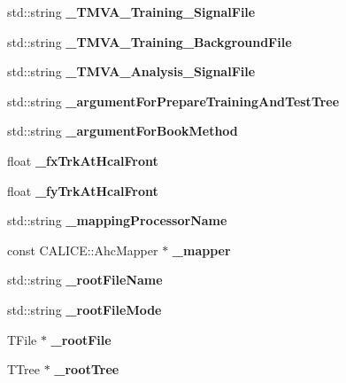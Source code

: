 \begin{DoxyCompactItemize}
\item 
std\-::string {\bfseries \-\_\-\-T\-M\-V\-A\-\_\-\-Training\-\_\-\-Signal\-File}\label{classHcalTMVAProcessor_a23b46bc83b036cf7f30d9cb97b285944}

\item 
std\-::string {\bfseries \-\_\-\-T\-M\-V\-A\-\_\-\-Training\-\_\-\-Background\-File}\label{classHcalTMVAProcessor_a99d2e077eceb739619f6a96980f6760c}

\item 
std\-::string {\bfseries \-\_\-\-T\-M\-V\-A\-\_\-\-Analysis\-\_\-\-Signal\-File}\label{classHcalTMVAProcessor_ae02107fea53a584976f0410b6736b334}

\item 
std\-::string {\bfseries \-\_\-argument\-For\-Prepare\-Training\-And\-Test\-Tree}\label{classHcalTMVAProcessor_a017d9bd4421477da408429969bc864f6}

\item 
std\-::string {\bfseries \-\_\-argument\-For\-Book\-Method}\label{classHcalTMVAProcessor_a1ec4a723499d288dbe4e73d07d4071c7}

\item 
float {\bfseries \-\_\-fx\-Trk\-At\-Hcal\-Front}\label{classHcalTMVAProcessor_a7ad14a383211affa5f97b60f18f3a41e}

\item 
float {\bfseries \-\_\-fy\-Trk\-At\-Hcal\-Front}\label{classHcalTMVAProcessor_ab7936148a25f097df87ca558b3abc106}

\item 
std\-::string {\bfseries \-\_\-mapping\-Processor\-Name}\label{classHcalTMVAProcessor_a52850d454438baf9ff1523ffde25191a}

\item 
const C\-A\-L\-I\-C\-E\-::\-Ahc\-Mapper $\ast$ {\bfseries \-\_\-mapper}\label{classHcalTMVAProcessor_a16047af3976807c609a9e91816662764}

\item 
std\-::string {\bfseries \-\_\-root\-File\-Name}\label{classHcalTMVAProcessor_a5e07d08f6ceaa0a14d712d05b93bb2bf}

\item 
std\-::string {\bfseries \-\_\-root\-File\-Mode}\label{classHcalTMVAProcessor_a8dfa042a0a07fa7122b99e8654cc3743}

\item 
T\-File $\ast$ {\bfseries \-\_\-root\-File}\label{classHcalTMVAProcessor_aabc121d4b37a5732a333b3ece61f5868}

\item 
T\-Tree $\ast$ {\bfseries \-\_\-root\-Tree}\label{classHcalTMVAProcessor_a2c4856e701ee9b82e8bffe84e84ac020}


\end{DoxyCompactItemize}
